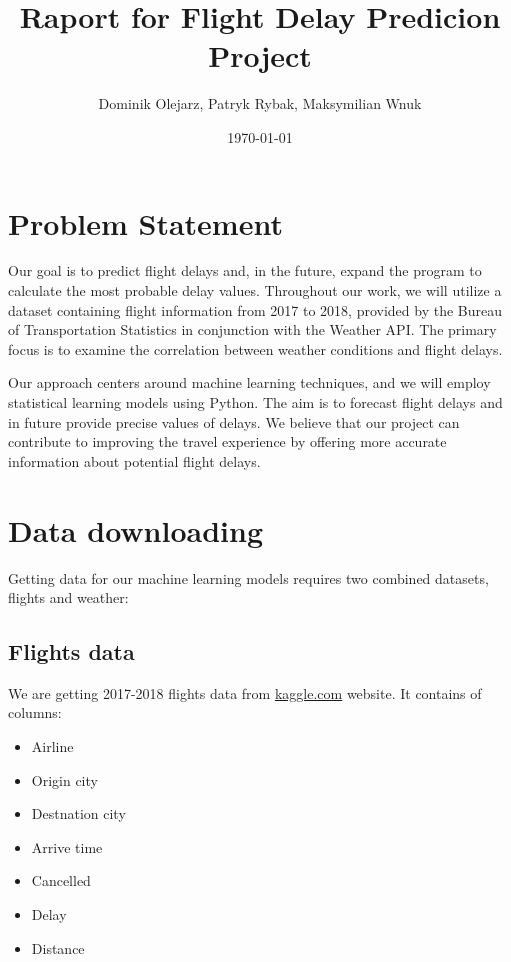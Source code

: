 \documentclass{article}
\title{Raport for Flight Delay Predicion Project} %
\author{Dominik Olejarz, Patryk Rybak, Maksymilian Wnuk} %
\date{\today} %
\begin{document}
 \maketitle
    
 \section{Problem Statement} %

Our goal is to predict flight delays and, in the future, expand the program to calculate the most probable delay values. Throughout our work, we will utilize a dataset containing flight information from 2017 to 2018, provided by the Bureau of Transportation Statistics in conjunction with the Weather API. The primary focus is to examine the correlation between weather conditions and flight delays.

Our approach centers around machine learning techniques, and we will employ statistical learning models using Python. The aim is to forecast flight delays and in future provide precise values of delays. We believe that our project can contribute to improving the travel experience by offering more accurate information about potential flight delays.

    
 \section{Data downloading}
Getting data for our machine learning models requires two combined datasets, 
flights and weather:
	\subsection{Flights data}
		We are getting 2017-2018 flights data from \url{kaggle.com} website.
		It contains of columns:	
			\begin{itemize}
\item Airline 
\item Origin city 
\item Destnation city
\item Arrive time  
\item Cancelled 
\item Delay  
\item Distance  
				
			\end{itemize}
\end{document}
